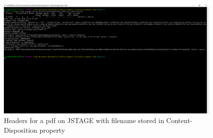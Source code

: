 \documentclass[12pt]{article}
\begin{document}
\begin{figure}[H]
    \centering
    \includegraphics[trim=0 60 10 20, clip, width=\textwidth] {Q3/q3_jstage_curl.PNG}
    \caption{Headers for a pdf on JSTAGE with filename stored in Content-Disposition property }
    \label{fig:q3JSTAGE_headers}
\end{figure}

\pagebreak
\RaggedRight
 
%

\end{document}
